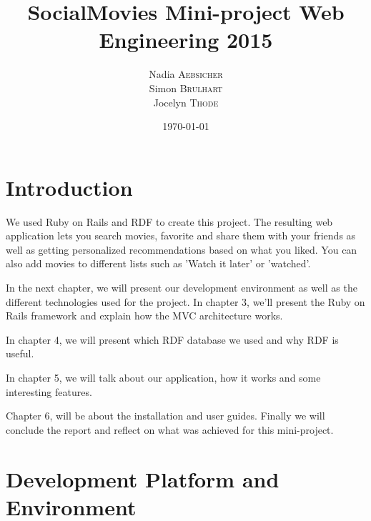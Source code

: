 \documentclass[12pt,a4paper]{article}
\begin{document}
\sloppy
\renewcommand{\thepage}{}
\pagestyle{empty}

\title{SocialMovies Mini-project  Web Engineering 2015}
\date{\today}
\author{Nadia \textsc{Aebsicher} \\ Simon \textsc{Brulhart} \\Jocelyn \textsc{Thode}\\}

\graphicspath{{figures/}}

\maketitle

\pagestyle{plain}
\tableofcontents
\newpage

\pagestyle{headings}



\section{Introduction}

We used Ruby on Rails and RDF to create this project. The resulting web application lets you search movies, favorite and share them with your friends as well as getting personalized recommendations based on what you liked. You can also add movies to different lists such as 'Watch it later' or 'watched'.

In the next chapter, we will present our development environment as well as the different technologies used for the project. In chapter 3, we'll present the Ruby on Rails framework and explain how the MVC architecture works.

In chapter 4, we will present which RDF database we used and why RDF is useful.

In chapter 5, we will talk about our application, how it works and some interesting features.

Chapter 6, will be about the installation and user guides. Finally we will conclude the report and reflect on what was achieved  for this mini-project.

\section{Development Platform and Environment}
\end{document}
